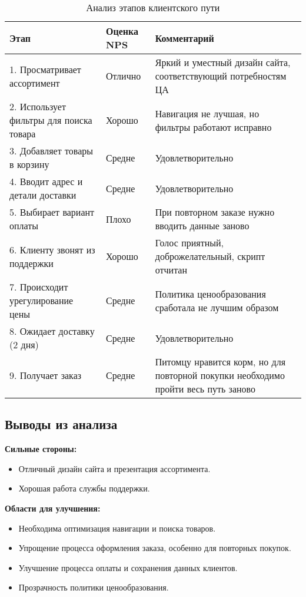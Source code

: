 \documentclass[a4paper,12pt]{article}
\begin{document}
\begin{table}[h!]
\centering
\begin{tabular}{p{6cm} p{2.5cm} p{6cm}}
\toprule
\textbf{Этап} & \textbf{Оценка NPS} & \textbf{Комментарий} \\
\midrule
1. Просматривает ассортимент & Отлично & Яркий и уместный дизайн сайта, соответствующий потребностям ЦА \\
2. Использует фильтры для поиска товара & Хорошо & Навигация не лучшая, но фильтры работают исправно \\
3. Добавляет товары в корзину & Средне & Удовлетворительно \\
4. Вводит адрес и детали доставки & Средне & Удовлетворительно \\
5. Выбирает вариант оплаты & Плохо & При повторном заказе нужно вводить данные заново \\
6. Клиенту звонят из поддержки & Хорошо & Голос приятный, доброжелательный, скрипт отчитан \\
7. Происходит урегулирование цены & Средне & Политика ценообразования сработала не лучшим образом \\
8. Ожидает доставку (2 дня) & Средне & Удовлетворительно \\
9. Получает заказ & Средне & Питомцу нравится корм, но для повторной покупки необходимо пройти весь путь заново \\
\bottomrule
\end{tabular}
\caption{Анализ этапов клиентского пути}
\end{table}

\subsection{Выводы из анализа}

\textbf{Сильные стороны:}

\begin{itemize}
  \item Отличный дизайн сайта и презентация ассортимента.
  \item Хорошая работа службы поддержки.
\end{itemize}

\textbf{Области для улучшения:}

\begin{itemize}
  \item Необходима оптимизация навигации и поиска товаров.
  \item Упрощение процесса оформления заказа, особенно для повторных покупок.
  \item Улучшение процесса оплаты и сохранения данных клиентов.
  \item Прозрачность политики ценообразования.
\end{itemize}
\end{document}
